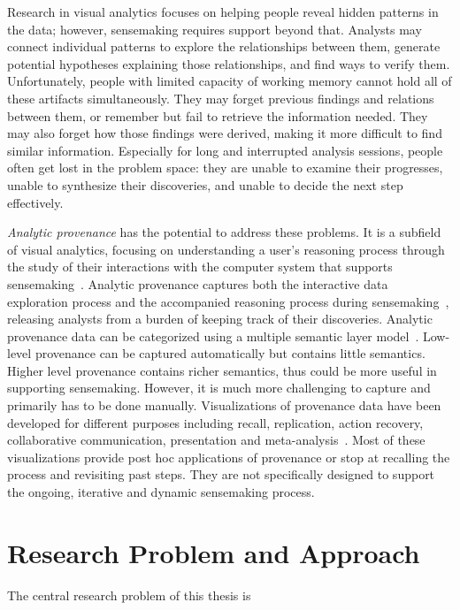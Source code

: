 Research in visual analytics focuses on helping people reveal hidden patterns in the data; however, sensemaking requires support beyond that. Analysts may connect individual patterns to explore the relationships between them, generate potential hypotheses explaining those relationships, and find ways to verify them. Unfortunately, people with limited capacity of working memory cannot hold all of these artifacts simultaneously. They may forget previous findings and relations between them, or remember but fail to retrieve the information needed. They may also forget how those findings were derived, making it more difficult to find similar information. Especially for long and interrupted analysis sessions, people often get lost in the problem space: they are unable to examine their progresses, unable to synthesize their discoveries, and unable to decide the next step effectively.

\emph{Analytic provenance} has the potential to address these problems. It is a subfield of  visual analytics, focusing on understanding a user's reasoning process through the study of their interactions with the computer system that supports sensemaking~\cite{North2011}. Analytic provenance captures both the interactive data exploration process and the accompanied reasoning process during sensemaking~\cite{Xu2015}, releasing analysts from a burden of keeping track of their discoveries. Analytic provenance data can be categorized using a multiple semantic layer model~\cite{Gotz2009}. Low-level provenance can be captured automatically but contains little semantics. Higher level provenance contains richer semantics, thus could be more useful in supporting sensemaking. However, it is much more challenging to capture and primarily has to be done manually. Visualizations of provenance data have been developed for different purposes including recall, replication, action recovery, collaborative communication, presentation and meta-analysis~\cite{Ragan2016}. Most of these visualizations provide post hoc applications of provenance or stop at recalling the process and revisiting past steps. They are not specifically designed to support the ongoing, iterative and dynamic sensemaking process.

\section{Research Problem and Approach}

The central research problem of this thesis is
\begin{center}
\end{center}

